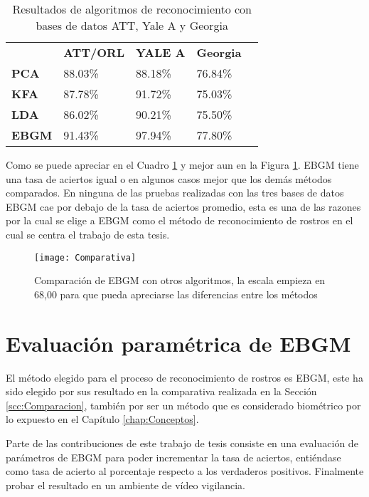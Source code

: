 \begin{table}[h]
\centering
\caption{Resultados de algoritmos de reconocimiento con bases de datos ATT, Yale A y Georgia}
\label{Tcomparacion}
\begin{tabular}{|l|l|l|l|l}
\cline{1-4}
              & \textbf{ATT/ORL} & \textbf{YALE A} & \textbf{Georgia} &  \\ \cline{1-4}
\textbf{PCA}  & 88.03\%          & 88.18\%         & 76.84\%          &  \\ \cline{1-4}
\textbf{KFA}  & 87.78\%          & 91.72\%         & 75.03\%          &  \\ \cline{1-4}
\textbf{LDA}  & 86.02\%          & 90.21\%         & 75.50\%          &  \\ \cline{1-4}
\textbf{EBGM} & 91.43\%          & 97.94\%         & 77.80\%          &  \\ \cline{1-4}
\end{tabular}
\end{table}
Como se puede apreciar en el Cuadro \ref{Tcomparacion} y mejor aun en la Figura \ref{Fcomparacion}. \ac{EBGM} tiene una tasa de aciertos igual o en algunos casos mejor que los demás métodos comparados. En ninguna de las pruebas realizadas con las tres bases de datos \ac{EBGM} cae por debajo de la tasa de aciertos promedio, esta es una de las razones por la cual se elige a \ac{EBGM} como el método de reconocimiento de rostros en el cual se centra el trabajo de esta tesis.

\begin{figure}[h]
\center
	\texttt{[image: Comparativa]}
    \caption{Comparación de \ac{EBGM} con otros algoritmos, la escala empieza en 68,00 para que pueda apreciarse las diferencias entre los métodos}
    \label{Fcomparacion}
\end{figure}
\section{Evaluación paramétrica de \ac{EBGM}}

El método elegido para el proceso de reconocimiento de rostros es \ac{EBGM}, este ha sido elegido por sus resultado en la comparativa realizada en la Sección \ref{scc:Comparacion}, también por ser un método que es considerado biométrico por lo expuesto en el Capítulo \ref{chap:Conceptos}.

Parte de las contribuciones de este trabajo de tesis consiste en una evaluación de parámetros de \ac{EBGM} para poder incrementar la tasa de aciertos, entiéndase como tasa de acierto al porcentaje respecto a los verdaderos positivos. Finalmente probar el resultado en un ambiente de vídeo vigilancia.

